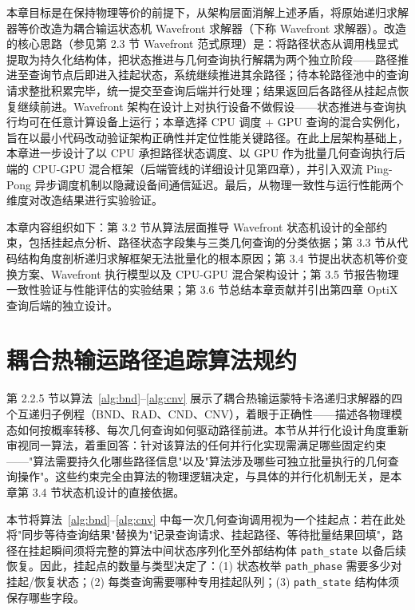 本章目标是在保持物理等价的前提下，从架构层面消解上述矛盾，将原始递归求解器等价改造为耦合输运状态机 Wavefront 求解器（下称 Wavefront 求解器）。改造的核心思路（参见第 2.3 节 Wavefront 范式原理）是：将路径状态从调用栈显式提取为持久化结构体，把状态推进与几何查询执行解耦为两个独立阶段——路径推进至查询节点后即进入挂起状态，系统继续推进其余路径；待本轮路径池中的查询请求整批积累完毕，统一提交至查询后端并行处理；结果返回后各路径从挂起点恢复继续前进。Wavefront 架构在设计上对执行设备不做假设——状态推进与查询执行均可在任意计算设备上运行；本章选择 CPU 调度 $+$ GPU 查询的混合实例化，旨在以最小代码改动验证架构正确性并定位性能关键路径。在此上层架构基础上，本章进一步设计了以 CPU 承担路径状态调度、以 GPU 作为批量几何查询执行后端的 CPU-GPU 混合框架（后端管线的详细设计见第四章），并引入双流 Ping-Pong 异步调度机制以隐藏设备间通信延迟。最后，从物理一致性与运行性能两个维度对改造结果进行实验验证。

本章内容组织如下：第 3.2 节从算法层面推导 Wavefront 状态机设计的全部约束，包括挂起点分析、路径状态字段集与三类几何查询的分类依据；第 3.3 节从代码结构角度剖析递归求解框架无法批量化的根本原因；第 3.4 节提出状态机等价变换方案、Wavefront 执行模型以及 CPU-GPU 混合架构设计；第 3.5 节报告物理一致性验证与性能评估的实验结果；第 3.6 节总结本章贡献并引出第四章 OptiX 查询后端的独立设计。

\section{耦合热输运路径追踪算法规约}

第 2.2.5 节以算法~\ref{alg:bnd}--\ref{alg:cnv} 展示了耦合热输运蒙特卡洛递归求解器的四个互递归子例程（BND、RAD、CND、CNV），着眼于正确性——描述各物理模态如何按概率转移、每次几何查询如何驱动路径前进。本节从并行化设计角度重新审视同一算法，着重回答：针对该算法的任何并行化实现需满足哪些固定约束——"算法需要持久化哪些路径信息"以及"算法涉及哪些可独立批量执行的几何查询操作"。这些约束完全由算法的物理逻辑决定，与具体的并行化机制无关，是本章第 3.4 节状态机设计的直接依据。

本节将算法~\ref{alg:bnd}--\ref{alg:cnv} 中每一次几何查询调用视为一个挂起点：若在此处将"同步等待查询结果"替换为"记录查询请求、挂起路径、等待批量结果回填"，路径在挂起瞬间须将完整的算法中间状态序列化至外部结构体 \texttt{path\_state} 以备后续恢复。因此，挂起点的数量与类型决定了：(1) 状态枚举 \texttt{path\_phase} 需要多少对挂起/恢复状态；(2) 每类查询需要哪种专用挂起队列；(3) \texttt{path\_state} 结构体须保存哪些字段。

